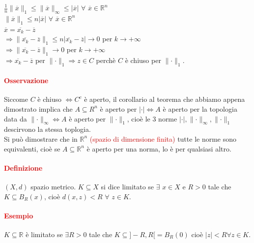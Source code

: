 \documentclass{article}
\newcommand{\R}{\mathbb{R}}
\begin{document}
\begin{itemize}
        $\frac{1}{n} \parallel \overline{x} \parallel_1 \leq \parallel \overline{x}\parallel_\infty \leq |\overline{x}|\,\, \forall\,\, \overline{x} \in \R^n$\\
        $\parallel \overline{x}\parallel_1 \leq n |\overline{x}| \,\,\forall\,\, \overline{x} \in \R^n$\\
        $\overline{x}=\overline{x_k}-\overline{z}$\\
        $\Rightarrow \parallel \overline{x_k}-\overline{z}\parallel_1 \leq n |\overline{x_k}-\overline{z}| \rightarrow 0$ per $k \rightarrow +\infty$\\
        $\Rightarrow \parallel \overline{x_k}-\overline{z} \parallel_1 \rightarrow 0$ per $k \rightarrow +\infty$\\
        $\Rightarrow \overline{x_k}-\overline{z}$ per $\parallel \cdot \parallel_1 \Rightarrow z \in C$ perchè $C$ è chiuso per $\parallel \cdot \parallel_1$.
\end{itemize}
\begin{flushright}
\large\Lightning
\end{flushright}

\paragraph{\textcolor{red}{Osservazione}}
Siccome $C$ è chiuso $\Leftrightarrow C^c$ è aperto, il corollario al teorema che abbiamo appena dimostrato implica che $A \subseteq R^n$ è aperto per $|\cdot|  \Leftrightarrow A $ è aperto per la topologia data da $\parallel \cdot \parallel_\infty \Leftrightarrow A$ è aperto per $\parallel \cdot \parallel_1$, cioè le 3 norme $|\cdot|, \parallel \cdot \parallel_\infty, \parallel \cdot \parallel_1$ descirvono la stessa toplogia.\\
Si può dimostrare che in $\R^n$ \textcolor{red}{(spazio di dimensione finita)} tutte le norme sono equivalenti, cioè se $A \subseteq \R^n$ è aperto per una norma, lo è per qualsiasi altro.

\paragraph{\textcolor{red}{Definizione}}
$(X,d)$ spazio metrico. $K \subseteq X$ si dice limitato se $\exists\,\, x \in X$ e $R>0$ tale che $ K \subseteq B_R(x)$, cioè $d(x,z)< R \,\, \forall \,\,z \in K$. 

\paragraph{\textcolor{red}{Esempio}}
$K\subseteq \R$ è limitato se $\exists R >0$ tale che $K \subseteq ]-R, R[ = B_R(0)$ cioè $|z| < R \forall z \in K$.
\end{document}

